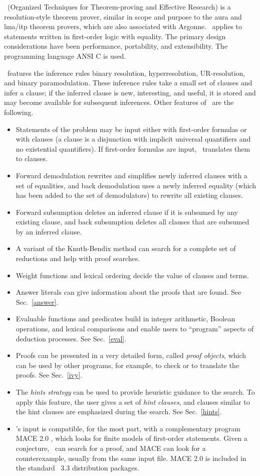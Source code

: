 \documentclass[11pt]{article}
\begin{document}
\otter\ (Organized Techniques for Theorem-proving and Effective
Research) is a resolution-style theorem prover, similar in scope and
purpose to the {\sc aura} \cite{AURA} and {\sc lma/itp} \cite{ITP}
theorem provers, which are also associated with Argonne.
\otter\ applies to statements written in first-order logic with equality.
The primary design considerations have been performance, portability, and
extensibility.  The programming language ANSI C is used.

\otter\ features the inference rules binary resolution,
hyperresolution, UR-resolution, and binary paramodulation.  These
inference rules take a small set of clauses and infer a clause; if the
inferred clause is new, interesting, and useful, it is stored and may
become available for subsequent inferences.
Other features of \otter\ are the following.
\begin{itemize}
\item
Statements of the problem may be input either with first-order
formulas or with clauses (a clause is a disjunction with implicit
universal quantifiers and no existential quantifiers).  If first-order
formulas are input, \otter\ translates them to clauses.
\item
Forward demodulation rewrites and simplifies newly inferred clauses
with a set of equalities, and back demodulation uses a newly inferred
equality (which has been added to the set of demodulators) to rewrite
all existing clauses.
\item
Forward subsumption deletes an inferred clause if it is subsumed by
any existing clause, and back subsumption deletes all clauses that are
subsumed by an inferred clause.
\item
A variant of the Knuth-Bendix method can search for a complete set of
reductions and help with proof searches.
\item
Weight functions and lexical ordering decide the value of
clauses and terms.
\item
Answer literals can give information about the proofs that are found.
See Sec.~\ref{answer}.
\item
Evaluable functions and predicates build in integer arithmetic,
Boolean operations, and lexical comparisons and enable users to
``program'' aspects of deduction processes.
See Sec.~\ref{eval}.
\item
Proofs can be presented in a very detailed form, called
\emph{proof objects}, which can be used by other programs,
for example, to check or to translate the proofs.
See Sec.~\ref{ivy}.
\item
The \emph{hints strategy} can be used to provide heuristic
guidance to the search.  To apply this feature, the user
gives a set of \emph{hint clauses}, and clauses similar to
the hint clauses are emphasized during the search.
See Sec.~\ref{hints}.
\item
\otter's input is compatible, for the most part, with
a complementary program MACE 2.0 \cite{mace2}, which
looks for finite models of first-order statements.  Given
a conjecture, \otter\ can search for a proof, and MACE 
can look for a counterexample, usually from the same
input file.  MACE 2.0 is included in the standard \otter\ 3.3
distribution packages.
\end{itemize}
\end{document}
